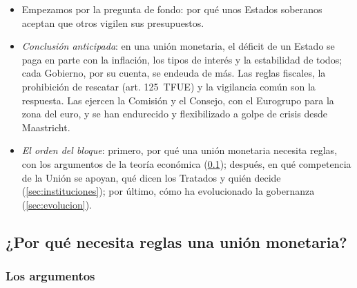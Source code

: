 \documentclass[11pt]{article}
\begin{document}
\begin{itemize}
\item Empezamos por la pregunta de fondo: por qué unos Estados soberanos aceptan que otros vigilen sus presupuestos.
\item \emph{Conclusión anticipada}: en una unión monetaria, el déficit de un Estado se paga en parte con la inflación, los tipos de interés y la estabilidad de todos; cada Gobierno, por su cuenta, se endeuda de más. Las reglas fiscales, la prohibición de rescatar (art. 125~TFUE) y la vigilancia común son la respuesta. Las ejercen la Comisión y el Consejo, con el Eurogrupo para la zona del euro, y se han endurecido y flexibilizado a golpe de crisis desde Maastricht.
\item \emph{El orden del bloque}: primero, por qué una unión monetaria necesita reglas, con los argumentos de la teoría económica (\ref{sec:por-que}); después, en qué competencia de la Unión se apoyan, qué dicen los Tratados y quién decide (\ref{sec:instituciones}); por último, cómo ha evolucionado la gobernanza (\ref{sec:evolucion}).
\end{itemize}

\subsection{¿Por qué necesita reglas una unión monetaria?}\label{sec:por-que}

\subsubsection{Los argumentos}\label{sec:argumentos}
\end{document}
